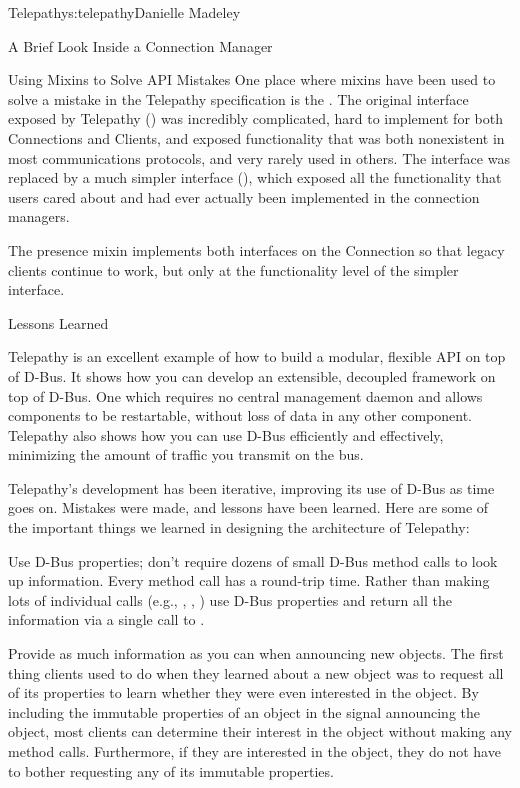 \begin{aosachapter}{Telepathy}{s:telepathy}{Danielle Madeley}
\begin{aosasect1}{A Brief Look Inside a Connection Manager}
\begin{aosabox}{Using Mixins to Solve API Mistakes}
One place where mixins have been used to solve a mistake in the
Telepathy specification is the .  The original
interface exposed by Telepathy
() was incredibly
complicated, hard to implement for both Connections and Clients, and
exposed functionality that was both nonexistent in most communications
protocols, and very rarely used in others. The interface was replaced
by a much simpler interface
(), which exposed all
the functionality that users cared about and had ever actually been
implemented in the connection managers.

The presence mixin implements both interfaces on the Connection so
that legacy clients continue to work, but only at the functionality
level of the simpler interface.

\end{aosabox}

\end{aosasect1}

\begin{aosasect1}{Lessons Learned}

Telepathy is an excellent example of how to build a modular, flexible
API on top of D-Bus. It shows how you can develop an extensible,
decoupled framework on top of D-Bus. One which requires no central
management daemon and allows components to be restartable, without
loss of data in any other component.  Telepathy also shows how you can
use D-Bus efficiently and effectively, minimizing the amount of
traffic you transmit on the bus.

Telepathy's development has been iterative, improving its use of D-Bus
as time goes on. Mistakes were made, and lessons have been learned.
Here are some of the important things we learned in designing the
architecture of Telepathy:

\begin{aosadescription}

  \item{Use D-Bus properties; don't require dozens of small D-Bus
    method calls to look up information.}  Every method call has a
    round-trip time. Rather than making lots of individual calls
    (e.g., , ,
    ) use D-Bus properties and return all the
    information via a single call to .

  \item{Provide as much information as you can when announcing new
    objects.}  The first thing clients used to do when they learned
    about a new object was to request all of its properties to learn
    whether they were even interested in the object. By including the
    immutable properties of an object in the signal announcing the
    object, most clients can determine their interest in the object
    without making any method calls. Furthermore, if they are
    interested in the object, they do not have to bother requesting
    any of its immutable properties.


\end{aosadescription}
\end{aosasect1}
\end{aosachapter}
